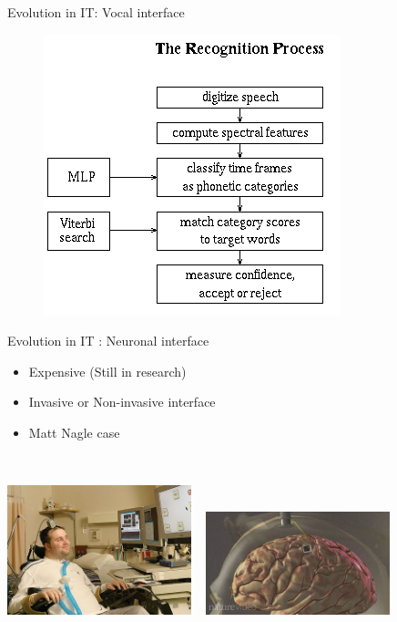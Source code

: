 \documentclass{beamer}
\begin{document}
\begin{frame}{Evolution in IT: Vocal interface}
\begin{figure}[ht]
\begin{minipage}[b]{0.30\linewidth}
\end{minipage}
\hspace{0.15cm}
\begin{minipage}[b]{0.40\linewidth}
\centering
\includegraphics[width=\textwidth]{recognition-process.png}

\end{minipage}
\end{figure}
\end{frame}

\begin{frame}{Evolution in IT : Neuronal interface}
\begin{itemize}
\item Expensive (Still in research)
\item Invasive or Non-invasive interface
\item Matt Nagle case
\end{itemize}

~\\

\begin{center}
    \includegraphics[width=0.4\textwidth]{matt-nagle.jpg} ~
    \includegraphics[width=0.4\textwidth]{brain-chip.jpg}
\end{center}

\end{frame}
\end{document}
